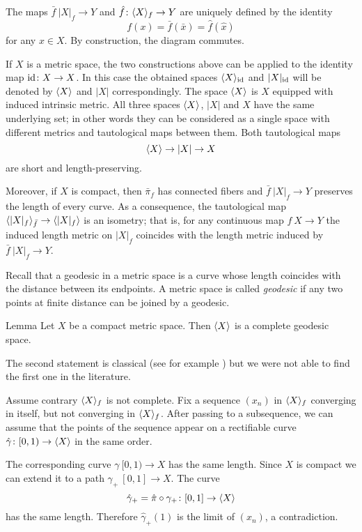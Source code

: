 \documentclass{article}
\begin{document}
The maps $\bar f\:|X|_f\to Y$ and $ \hat f\colon\langle X\rangle_f\to Y$ are uniquely defined by the identity
\[f(x)=\bar f(\bar x)=  \hat f( \hat x)\] for any $x\in X$.
By construction, the diagram commutes.

If $X$ is a metric space, the two constructions above can be applied to the identity map $\mathrm{id}\colon X\to X$.
In this case the obtained spaces $\langle X\rangle_{\mathrm{id}}$ and $|X|_{\mathrm{id}}$ will be denoted by $\langle X\rangle$ and $|X|$ correspondingly.
The space $\langle X\rangle$ is $X$ equipped with induced intrinsic metric.
All three spaces $\langle X\rangle$, $|X|$ and $X$ have the same underlying set;
in other words they can be considered as a single space with different metrics and tautological maps between them.
Both tautological maps 
\[\langle X\rangle\to |X|\to X\]
are short and length-preserving.

Moreover, if $X$ is compact, then $\bar\pi_f$ has connected fibers and $\bar f\:|X|_f\to Y$ preserves the length of every curve.
As a consequence,  the tautological map $\<|X|_f\>_{\bar f}\zz\to \<|X|_f\>$ is an isometry;
that is, for any continuous map $f\:X\to Y$ the induced length metric on $|X|_f$ coincides with the length metric induced by 
$\bar f\:|X|_f\to Y$.


Recall that a geodesic in a metric space is a curve whose length coincides with the distance between its endpoints.
A metric space is called \emph{geodesic} if any two points at finite distance can be joined by a geodesic.

\begin{thm}{Lemma}\label{lem:geospace}
Let $X$ be a compact metric space. 
Then $\langle X\rangle$ is a complete geodesic space.
\end{thm}

The second statement is classical (see for example \cite[II-\S8 Thm. 3]{KF}) but 
we were not able to find the first one in the literature.

Assume contrary $\langle X\rangle_f$ is not complete.
Fix a sequence $(x_n)$ in $\langle X\rangle_f$ converging in itself, but not converging in $\langle X\rangle_f$.
After passing to a subsequence, we can assume that the points of the sequence appear on a rectifiable curve $\hat\gamma\colon[0,1)\to\langle X\rangle$ in the same order.

The corresponding curve $\gamma\:[0,1)\to X$ has the same length.
Since $X$ is compact we can extend it to a path $\gamma_+\:[0,1]\to X$.
The curve 
\[\hat\gamma_+=\hat\pi\circ\gamma_+\colon[0,1]\to\langle X\rangle\]
has the same length.
Therefore $\hat\gamma_+(1)$ is the limit of $(x_n)$, a contradiction.
\end{document}
